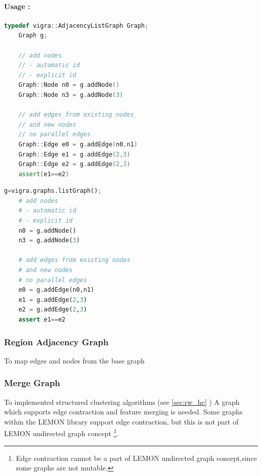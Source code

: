 \paragraph{Usage :}
    \begin{lstlisting}[language=c++]
    typedef vigra::AdjacencyListGraph Graph;
    Graph g;

    // add nodes 
    // - automatic id
    // - explicit id
    Graph::Node n0 = g.addNode() 
    Graph::Node n3 = g.addNode(3)

    // add edges from existing nodes
    // and new nodes
    // no parallel edges 
    Graph::Edge e0 = g.addEdge(n0,n1)
    Graph::Edge e1 = g.addEdge(2,3)
    Graph::Edge e2 = g.addEdge(2,3)
    assert(e1==e2)  
    \end{lstlisting}

    \begin{lstlisting}[language=Python]
    g=vigra.graphs.listGraph();
    # add nodes 
    # - automatic id
    # - explicit id
    n0 = g.addNode() 
    n3 = g.addNode(3)

    # add edges from existing nodes
    # and new nodes
    # no parallel edges 
    e0 = g.addEdge(n0,n1)
    e1 = g.addEdge(2,3)
    e2 = g.addEdge(2,3)
    assert e1==e2  
    \end{lstlisting}
\subsubsection{Region Adjacency Graph} \label{sec:graphs_rag}







To map edges and nodes from the base graph


\subsubsection{Merge Graph} \label{sec:graphs_merge_graph}

To implemented structured clustering algorithms (see \cref{sec:rw_hc} ) 
A graph which supports edge contraction and feature merging is needed.
Some graphs within the LEMON library support 
edge contraction, but this is not part of LEMON undirected graph concept \footnote{
Edge contraction cannot be a part of LEMON undirected graph concept,since some graphs
are not mutable.}.

